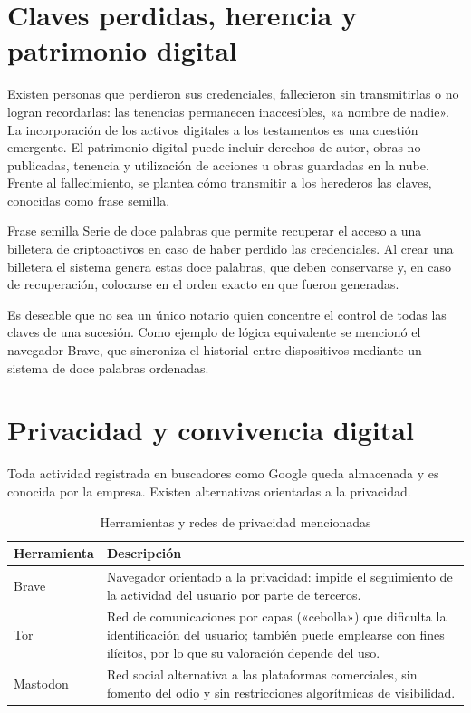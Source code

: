 \documentclass[12pt,oneside]{book}
\begin{document}
\section{Claves perdidas, herencia y patrimonio digital}

Existen personas que perdieron sus credenciales, fallecieron sin transmitirlas o no logran recordarlas: las tenencias permanecen inaccesibles, «a nombre de nadie». La incorporación de los activos digitales a los testamentos es una cuestión emergente. El patrimonio digital puede incluir derechos de autor, obras no publicadas, tenencia y utilización de acciones u obras guardadas en la nube. Frente al fallecimiento, se plantea cómo transmitir a los herederos las claves, conocidas como frase semilla.

\begin{definition}{Frase semilla}
Serie de doce palabras que permite recuperar el acceso a una billetera de criptoactivos en caso de haber perdido las credenciales. Al crear una billetera el sistema genera estas doce palabras, que deben conservarse y, en caso de recuperación, colocarse en el orden exacto en que fueron generadas.
\end{definition}

Es deseable que no sea un único notario quien concentre el control de todas las claves de una sucesión. Como ejemplo de lógica equivalente se mencionó el navegador Brave, que sincroniza el historial entre dispositivos mediante un sistema de doce palabras ordenadas.

\section{Privacidad y convivencia digital}

Toda actividad registrada en buscadores como Google queda almacenada y es conocida por la empresa. Existen alternativas orientadas a la privacidad.

\begin{table}[H]
\centering
\caption{Herramientas y redes de privacidad mencionadas}
\renewcommand{\arraystretch}{1.2}
\begin{tabularx}{\textwidth}{>{\raggedright\arraybackslash}p{}X}
\toprule
\textbf{Herramienta} & \textbf{Descripción} \\
\midrule
Brave & Navegador orientado a la privacidad: impide el seguimiento de la actividad del usuario por parte de terceros. \\
Tor & Red de comunicaciones por capas («cebolla») que dificulta la identificación del usuario; también puede emplearse con fines ilícitos, por lo que su valoración depende del uso. \\
Mastodon & Red social alternativa a las plataformas comerciales, sin fomento del odio y sin restricciones algorítmicas de visibilidad. \\
\bottomrule
\end{tabularx}
\end{table}
\end{document}
